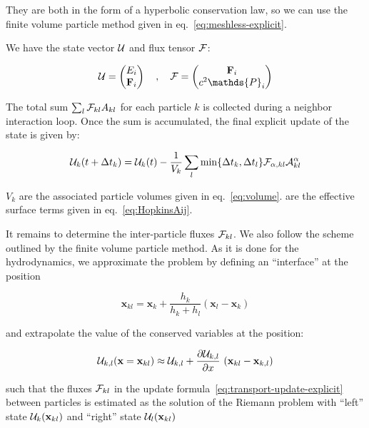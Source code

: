They are both in the form of a hyperbolic conservation law, so we can use the finite volume
particle method given in eq.~\ref{eq:meshless-explicit}.

We have the state vector $\mathcal{U}$ and flux tensor $\mathcal{F}$:

\begin{align}
	\U =
		\begin{pmatrix}
			E_i \\
			\Fbf_i
		\end{pmatrix}
	\quad , \quad
	\F =
		\begin{pmatrix}
			\Fbf_i \\
			c^2 \mathds{P}_i
		\end{pmatrix}
\end{align}

The total sum $\sum_l \mathcal{F}_{kl} A_{kl}$ for each particle $k$ is collected during a neighbor
interaction loop. Once the sum is accumulated, the final explicit update of the state is given by:

\begin{align}
\mathcal{U}_k(t + \Delta t_k) =
	\mathcal{U}_k (t) - \frac{1}{V_k} \sum\limits_{l} \min\{\Delta t_k, \Delta t_l\}
    \mathcal{F}_{\alpha,kl} \mathcal{A}_{kl}^\alpha
\label{eq:transport-update-explicit}
\end{align}

$V_k$ are the associated particle volumes given in eq.~\ref{eq:volume}. \Aij are the effective
surface terms given in eq.~\ref{eq:HopkinsAij}.





It remains to determine the inter-particle fluxes $\mathcal{F}_{kl}$. We also follow the scheme outlined by
the finite volume particle method. As it is done for the hydrodynamics, we approximate the problem
by defining an ``interface'' at the position

\begin{equation}
	\mathbf{x}_{kl} = \mathbf{x}_k + \frac{h_k}{h_k + h_l} ( \mathbf{x}_l - \mathbf{x}_k )
\end{equation}

and extrapolate the value of the conserved variables at the position:

\begin{equation}
	\U_{k, l}(\mathbf{x} =
        \mathbf{x}_{kl}) \approx \U_{k, l} + \DELDX{ \U_{k, l}}\ (\mathbf{x}_{kl}
- \mathbf{x}_{k,l}) \label{eq:gradient-extrapolation}
\end{equation}


such that the fluxes $\mathcal{F}_{kl}$ in the update formula~\ref{eq:transport-update-explicit} between
particles is estimated as the solution of the Riemann problem with ``left'' state $\mathcal{U}_k(\mathbf{x}_{kl})$
and ``right'' state $\mathcal{U}_l(\mathbf{x}_{kl})$

